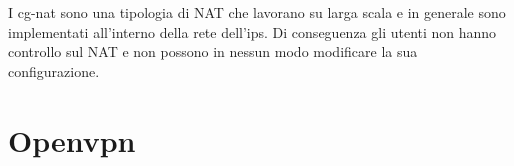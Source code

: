 I cg-nat sono una tipologia di NAT che lavorano su larga scala e in generale sono implementati all'interno della rete dell'ips.
Di conseguenza gli utenti non hanno controllo sul NAT e non possono in nessun modo modificare la sua configurazione.


\section{Openvpn}

